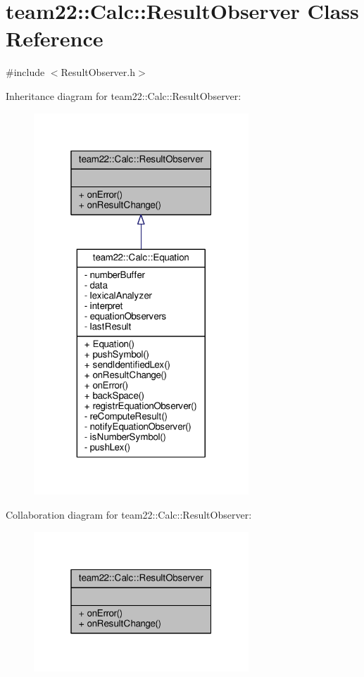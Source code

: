 \hypertarget{classteam22_1_1_calc_1_1_result_observer}{}\section{team22\+:\+:Calc\+:\+:Result\+Observer Class Reference}
\label{classteam22_1_1_calc_1_1_result_observer}


{\ttfamily \#include $<$Result\+Observer.\+h$>$}



Inheritance diagram for team22\+:\+:Calc\+:\+:Result\+Observer\+:
\nopagebreak
\begin{figure}[H]
\begin{center}
\leavevmode
\includegraphics[width=229pt]{classteam22_1_1_calc_1_1_result_observer__inherit__graph}
\end{center}
\end{figure}


Collaboration diagram for team22\+:\+:Calc\+:\+:Result\+Observer\+:
\nopagebreak
\begin{figure}[H]
\begin{center}
\leavevmode
\includegraphics[width=229pt]{classteam22_1_1_calc_1_1_result_observer__coll__graph}
\end{center}
\end{figure}
